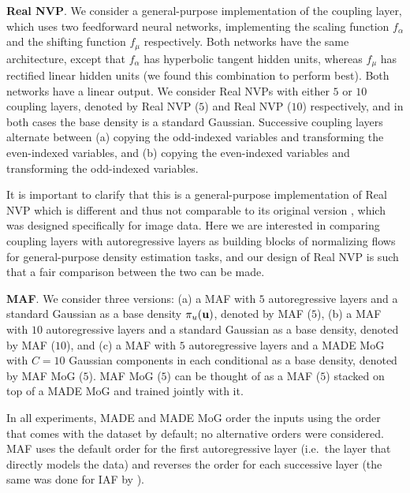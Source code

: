\textbf{Real NVP}\@. We consider a general-purpose implementation of the coupling layer, which uses two feedforward neural networks, implementing the scaling function $f_{\alpha}$ and the shifting function $f_{\mu}$ respectively. Both networks have the same architecture, except that $f_{\alpha}$ has hyperbolic tangent hidden units, whereas $f_{\mu}$ has rectified linear hidden units (we found this combination to perform best). Both networks have a linear output. We consider Real NVPs with either $5$ or $10$ coupling layers, denoted by Real NVP ($5$) and Real NVP ($10$) respectively, and in both cases the base density is a standard Gaussian. Successive coupling layers alternate between (a) copying the odd-indexed variables and transforming the even-indexed variables, and (b) copying the even-indexed variables and transforming the odd-indexed variables.

It is important to clarify that this is a general-purpose implementation of Real NVP which is different and thus not comparable to its original version \citep{Dinh:2017}, which was designed specifically for image data. Here we are interested in comparing coupling layers with autoregressive layers as building blocks of normalizing flows for general-purpose density estimation tasks, and our design of Real NVP is such that a fair comparison between the two can be made.

\textbf{MAF}\@. We consider three versions: (a) a MAF with $5$ autoregressive layers and a standard Gaussian as a base density $\pi_u\mathopen{}\left(\mathbf{u}\right)\mathclose{}$, denoted by MAF ($5$), (b) a MAF with $10$ autoregressive layers and a standard Gaussian as a base density, denoted by MAF ($10$), and (c) a MAF with $5$ autoregressive layers and a MADE MoG with $C\!=\!10$ Gaussian components in each conditional as a base density, denoted by MAF MoG ($5$)\@. MAF MoG ($5$) can be thought of as a MAF ($5$) stacked on top of a MADE MoG and trained jointly with it.

In all experiments, MADE and MADE MoG order the inputs using the order that comes with the dataset by default; no alternative orders were considered. MAF uses the default order for the first autoregressive layer (i.e.~the layer that directly models the data) and reverses the order for each successive layer (the same was done for IAF by \citet{Kingma:2016}).

